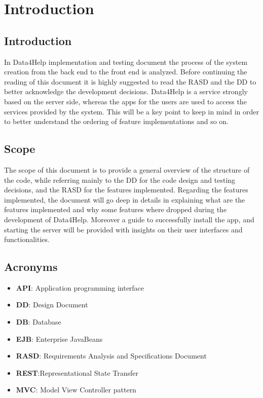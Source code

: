 \section{Introduction}

\subsection{Introduction}
In Data4Help implementation and testing document the process of the system creation from the back end to the front end is analyzed. Before continuing the reading of this document it is highly suggested to read the RASD and the DD to better acknowledge the development decisions.
Data4Help is a service strongly based on the server side, whereas the apps for the users are used to access 
the services provided by the system.
This will be a key point to keep in mind in order to better understand the ordering of feature implementations and so on.

\subsection{Scope}
The scope of this document is to provide a general overview of the structure of the code, while referring mainly to the DD for the code design and testing decisions, and the RASD for the features implemented.
Regarding the features implemented, the document will go deep in details in explaining what are the features implemented and why some features where dropped during the development of Data4Help.
Moreover a guide to successfully install the app, and starting the server will be provided with insights on their user interfaces and functionalities.


\subsection{Acronyms}

\begin{itemize}
\item \textbf{API}: Application programming interface
\item \textbf{DD}: Design Document
\item \textbf{DB}: Database
\item \textbf{EJB}: Enterprise JavaBeans
\item \textbf{RASD}: Requirements Analysis and Specifications Document
\item \textbf{REST}:Representational State Transfer
\item \textbf{MVC}: Model View Controller pattern
\end{itemize}


